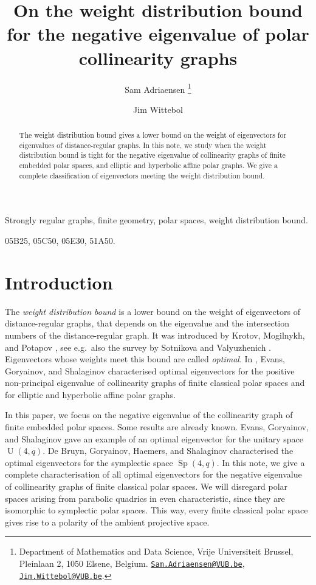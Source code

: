 \documentclass[a4paper]{article}
\title{On the weight distribution bound for the negative eigenvalue of polar collinearity graphs}
\author{Sam Adriaensen
\thanks{Department of Mathematics and Data Science, Vrije Universiteit Brussel, Pleinlaan 2, 1050 Elsene, Belgium.
\href{mailto:Sam.Adriaensen@vub.be}{\texttt{Sam.Adriaensen@VUB.be}}, \href{mailto:Jim.Wittebol@vub.be}{\texttt{Jim.Wittebol@VUB.be}}.}
\and Jim Wittebol \footnotemark[1]}
\date{}
\theoremstyle{definition}
\DeclareMathOperator{\Sp}{Sp}
\DeclareMathOperator{\U}{U}
\begin{document}
\maketitle

\begin{abstract}
 The weight distribution bound gives a lower bound on the weight of eigenvectors for eigenvalues of distance-regular graphs.
 In this note, we study when the weight distribution bound is tight for the negative eigenvalue of collinearity graphs of finite embedded polar spaces, and elliptic and hyperbolic affine polar graphs.
 We give a complete classification of eigenvectors meeting the weight distribution bound.
\end{abstract}

 Strongly regular graphs, finite geometry, polar spaces, weight distribution bound.

 05B25, 05C50, 05E30, 51A50.

\section{Introduction}

The \emph{weight distribution bound} is a lower bound on the weight of eigenvectors of distance-regular graphs, that depends on the eigenvalue and the intersection numbers of the distance-regular graph.
It was introduced by Krotov, Mogilnykh, and Potapov \cite{Krotov}, see e.g.\ also the survey by Sotnikova and Valyuzhenich \cite{Sotnikova}.
Eigenvectors whose weights meet this bound are called \emph{optimal}.
In \cite[Theorem 1]{Evans}, Evans, Goryainov, and Shalaginov characterised optimal eigenvectors for the positive non-principal eigenvalue of collinearity graphs of finite classical polar spaces and for elliptic and hyperbolic affine polar graphs.

In this paper, we focus on the negative eigenvalue of the collinearity graph of finite embedded polar spaces.
Some results are already known.
Evans, Goryainov, and Shalaginov \cite[Proposition 5]{Evans} gave an example of an optimal eigenvector for the unitary space $\U(4,q)$.
De Bruyn, Goryainov, Haemers, and Shalaginov \cite[Theorem 8]{DeBruynEtAl} characterised the optimal eigenvectors for the symplectic space $\Sp(4,q)$.
In this note, we give a complete characterisation of all optimal eigenvectors for the negative eigenvalue of collinearity graphs of finite classical polar spaces.
We will disregard polar spaces arising from parabolic quadrics in even characteristic, since they are isomorphic to symplectic polar spaces.
This way, every finite classical polar space gives rise to a polarity of the ambient projective space.
\end{document}
